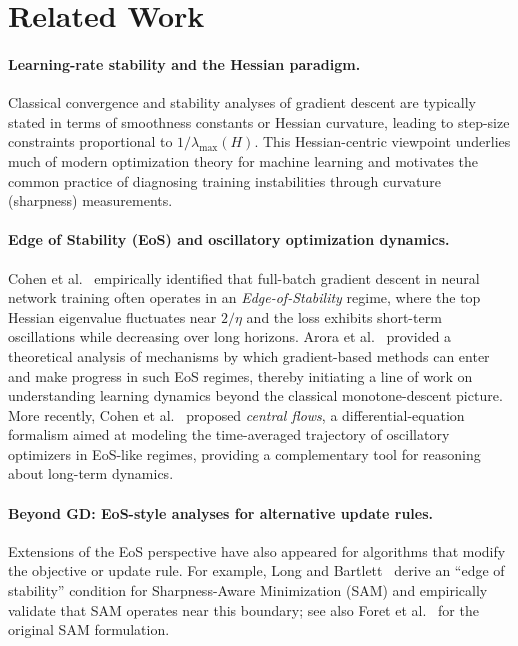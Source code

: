 \section{Related Work}

\paragraph{Learning-rate stability and the Hessian paradigm.}
Classical convergence and stability analyses of gradient descent are typically
stated in terms of smoothness constants or Hessian curvature, leading to
step-size constraints proportional to $1/\lambda_{\max}(H)$.
This Hessian-centric viewpoint underlies much of modern optimization theory
for machine learning and motivates the common practice of diagnosing training
instabilities through curvature (sharpness) measurements.

\paragraph{Edge of Stability (EoS) and oscillatory optimization dynamics.}
Cohen et al.~\cite{cohen2021eos} empirically identified that full-batch gradient descent
in neural network training often operates in an \emph{Edge-of-Stability} regime,
where the top Hessian eigenvalue fluctuates near $2/\eta$ and the loss exhibits
short-term oscillations while decreasing over long horizons.
Arora et al.~\cite{arora2022eos} provided a theoretical analysis of mechanisms by which
gradient-based methods can enter and make progress in such EoS regimes,
thereby initiating a line of work on understanding learning dynamics beyond
the classical monotone-descent picture.
More recently, Cohen et al.~\cite{cohen2024centralflows} proposed \emph{central flows},
a differential-equation formalism aimed at modeling the time-averaged trajectory
of oscillatory optimizers in EoS-like regimes, providing a complementary tool
for reasoning about long-term dynamics.

\paragraph{Beyond GD: EoS-style analyses for alternative update rules.}
Extensions of the EoS perspective have also appeared for algorithms that modify
the objective or update rule.
For example, Long and Bartlett~\cite{long2024sameos} derive an ``edge of stability''
condition for Sharpness-Aware Minimization (SAM) and empirically validate that
SAM operates near this boundary; see also Foret et al.~\cite{foret2020sam} for
the original SAM formulation.

